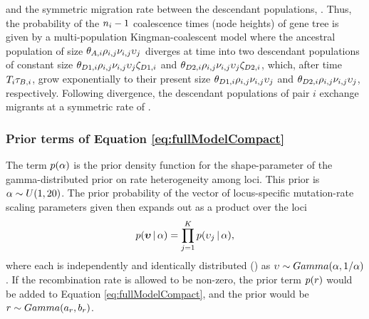 \begin{linenomath}
and the symmetric migration rate between the descendant populations,
\migrationRate{}.
Thus, the probability of the $\popSampleSize{i}{}-1$ coalescence times (node
heights) of gene tree  is given by a multi-population
Kingman-coalescent model \citep{Kingman1982} where the ancestral population of
size
$\ancestralTheta{i}\ploidyScalar{i}{j}\mutationRateScalarConstant{i}{j}\locusMutationRateScalar{j}$
diverges at time  into two descendant populations of constant
size
$\descendantTheta{1}{i}\ploidyScalar{i}{j}\mutationRateScalarConstant{i}{j}\locusMutationRateScalar{j}\bottleScalar{1}{i}$
and
$\descendantTheta{2}{i}\ploidyScalar{i}{j}\mutationRateScalarConstant{i}{j}\locusMutationRateScalar{j}\bottleScalar{2}{i}$,
which, after time $\divTimeMap{i}\bottleTime{i}$, grow exponentially to their
present size 
$\descendantTheta{1}{i}\ploidyScalar{i}{j}\mutationRateScalarConstant{i}{j}\locusMutationRateScalar{j}$
and
$\descendantTheta{2}{i}\ploidyScalar{i}{j}\mutationRateScalarConstant{i}{j}\locusMutationRateScalar{j}$,
respectively.
Following divergence, the descendant populations of pair $i$ exchange migrants at a symmetric rate of
.
\end{linenomath}


\subsubsection*{Prior terms of Equation \ref{eq:fullModelCompact}}
\begin{linenomath}
The term $p(\alpha)$ is the prior density
function for the shape-parameter of the gamma-distributed prior on
rate heterogeneity among loci.
This prior is $\alpha \sim U(1, 20)$.
The prior probability of the vector of locus-specific mutation-rate scaling parameters
given \locusRateHetShapeParameter then expands out as a product over
the loci
\begin{equation}
    p(\boldsymbol{\upsilon} \,|\, \alpha) =
    \prod_{j=1}^{K}
    p(\upsilon_{j} \,|\, \alpha),
    \label{eq:locusRateHetPrior}
\end{equation}
where each \locusMutationRateScalar{} is independently and identically
distributed (\iid) as
$\upsilon_{} \sim Gamma(\alpha,
1/\alpha)$.
If the recombination rate \recombinationRate is allowed to be
non-zero, the prior term $p(r)$ would be added
to Equation \ref{eq:fullModelCompact}, and the prior would be
$r \sim Gamma(a_{r},
b_{r})$.
\end{linenomath}

